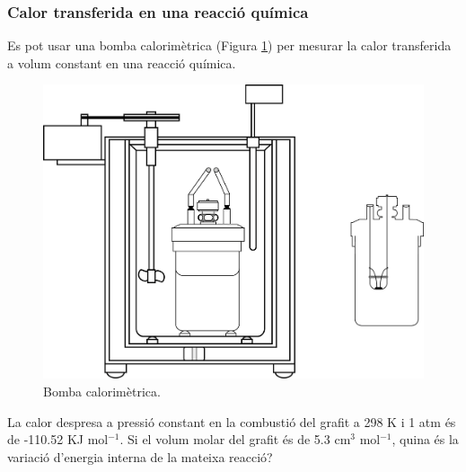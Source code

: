 \subsubsection{Calor transferida en una reacció química}
Es pot usar una bomba calorimètrica (Figura \ref{fig:Bomb_calorimeter_scheme}) per mesurar la calor transferida a volum constant en una reacció química.
\begin{figure}[h]
\centering
\includegraphics[scale=0.5]{figures/Bomb_calorimeter_scheme.png}
\caption{Bomba calorimètrica.}
\label{fig:Bomb_calorimeter_scheme}
\end{figure}

\begin{exr}
La calor despresa a pressió constant en la combustió del grafit a 298 K i 1 atm és de -110.52 KJ mol$^{-1}$. Si el volum molar del grafit és de 5.3 cm$^3$ mol$^{-1}$, quina és la variació d'energia interna de la mateixa reacció?
\end{exr}

